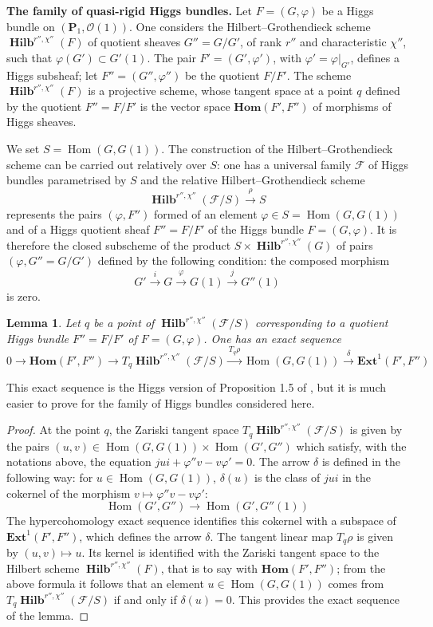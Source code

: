 \documentclass[12pt,english]{smfart}%
\theoremstyle{plain}
\newtheorem{lemma}[theorem]{Lemma}
\theoremstyle{definition}
\theoremstyle{remark}
\newcommand{\PP}{\mathbf{P}}
\newcommand{\Oh}{\mathcal{O}}
\DeclareMathOperator{\Hom}{Hom}
\DeclareMathOperator{\Hilb}{\mathbf{Hilb}}
\newcommand{\BHom}{\mathbf{Hom}}
\newcommand{\BExt}{\mathbf{Ext}}
\newcommand{\origpage}[1]{\marginnote{\scriptsize\itshape p.~#1}}
\begin{document}
\medskip
\noindent\textbf{The family of quasi-rigid Higgs bundles.} Let $F=(G,\varphi)$ be a Higgs bundle on $(\PP_{1},\Oh(1))$. One considers the Hilbert--Grothendieck scheme $\Hilb^{r'',\chi''}(F)$ of quotient sheaves $G''=G/G'$, of rank $r''$ and characteristic $\chi''$, such that $\varphi(G')\subset G'(1)$. The pair $F'=(G',\varphi')$, with $\varphi'=\varphi|_{G'}$, defines a Higgs subsheaf; let $F''=(G'',\varphi'')$ be the quotient $F/F'$. The scheme $\Hilb^{r'',\chi''}(F)$ is a projective scheme, whose tangent space at a point $q$ defined by the quotient $F''=F/F'$ is the vector space $\BHom(F',F'')$ of morphisms of Higgs sheaves.

We set $S=\Hom(G,G(1))$. The construction of the Hilbert--Grothendieck scheme can be carried out relatively over $S$: one has a universal family $\mathscr{F}$ of Higgs bundles parametrised by $S$ and the relative Hilbert--Grothendieck scheme
\[
\Hilb^{r'',\chi''}(\mathscr{F}/S) \stackrel{\rho}{\longrightarrow} S
\]
represents the pairs $(\varphi,F'')$ formed of an element $\varphi\in S=\Hom(G,G(1))$ and of a Higgs quotient sheaf $F''=F/F'$ of the Higgs bundle $F=(G,\varphi)$. It is therefore the closed subscheme of the product $S\times\Hilb^{r'',\chi''}(G)$ of pairs $(\varphi,G''=G/G')$ defined by the following condition: the composed morphism
\[
G' \stackrel{i}{\longrightarrow} G \stackrel{\varphi}{\longrightarrow} G(1)
\stackrel{j}{\longrightarrow} G''(1)
\]
is zero.

\origpage{652}
\begin{lemma}\label{lem:higgs-exact}
Let $q$ be a point of $\Hilb^{r'',\chi''}(\mathscr{F}/S)$ corresponding to a quotient Higgs bundle $F''=F/F'$ of $F=(G,\varphi)$. One has an exact sequence
\[
0 \to \BHom(F',F'') \to T_{q}\Hilb^{r'',\chi''}(\mathscr{F}/S)
\stackrel{T_{q}\rho}{\longrightarrow} \Hom(G,G(1))
\stackrel{\delta}{\longrightarrow} \BExt^{1}(F',F'')
\]
\end{lemma}

This exact sequence is the Higgs version of Proposition 1.5 of \cite{Dre2}, but it is much easier to prove for the family of Higgs bundles considered here.

\begin{proof}
At the point $q$, the Zariski tangent space $T_{q}\Hilb^{r'',\chi''}(\mathscr{F}/S)$ is given by the pairs $(u,v)\in\Hom(G,G(1))\times\Hom(G',G'')$ which satisfy, with the notations above, the equation $jui+\varphi''v-v\varphi'=0$. The arrow $\delta$ is defined in the following way: for $u\in\Hom(G,G(1))$, $\delta(u)$ is the class of $jui$ in the cokernel of the morphism $v\mapsto\varphi''v-v\varphi'$:
\[
\Hom(G',G'') \longrightarrow \Hom(G',G''(1))
\]
The hypercohomology exact sequence identifies this cokernel with a subspace of $\BExt^{1}(F',F'')$, which defines the arrow $\delta$. The tangent linear map $T_{q}\rho$ is given by $(u,v)\mapsto u$. Its kernel is identified with the Zariski tangent space to the Hilbert scheme $\Hilb^{r'',\chi''}(F)$, that is to say with $\BHom(F',F'')$; from the above formula it follows that an element $u\in\Hom(G,G(1))$ comes from $T_{q}\Hilb^{r'',\chi''}(\mathscr{F}/S)$ if and only if $\delta(u)=0$. This provides the exact sequence of the lemma.
\end{proof}
\end{document}
